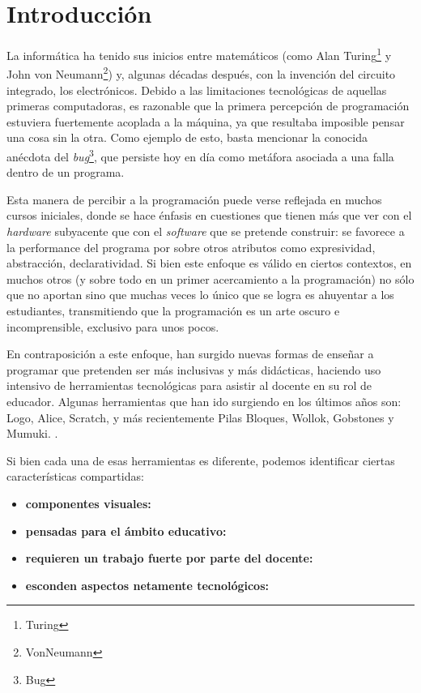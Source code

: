 
\newcommand{\caracteristica}[1]{\item \textbf{#1:}}

\section{Introducción}
La informática ha tenido sus inicios entre matemáticos (como Alan Turing\footnote{Turing} y John von Neumann\footnote{VonNeumann}) y, algunas décadas después, con la invención del circuito integrado, los electrónicos. Debido a las limitaciones tecnológicas de aquellas primeras computadoras, es razonable que la primera percepción de programación estuviera fuertemente acoplada a la máquina, ya que resultaba imposible pensar una cosa sin la otra. Como ejemplo de esto, basta mencionar la conocida anécdota del \textit{bug}\footnote{Bug}, que persiste hoy en día como metáfora asociada a una falla dentro de un programa.


Esta manera de percibir a la programación puede verse reflejada en muchos cursos iniciales, donde se hace énfasis en cuestiones que tienen más que ver con el \textit{hardware} subyacente que con el \textit{software} que se pretende construir: se favorece a la performance del programa por sobre otros atributos como expresividad, abstracción, declaratividad. Si bien este enfoque es válido en ciertos contextos, en muchos otros (y sobre todo en un primer acercamiento a la programación) no sólo que no aportan sino que muchas veces lo único que se logra es ahuyentar a los estudiantes, transmitiendo que la programación es un arte oscuro e incomprensible, exclusivo para unos pocos.

En contraposición a este enfoque, han surgido nuevas formas de enseñar a programar que pretenden ser más inclusivas y más didácticas, haciendo uso intensivo de herramientas tecnológicas para asistir al docente en su rol de educador. Algunas herramientas que han ido surgiendo en los últimos años son: Logo, Alice, Scratch, y más recientemente Pilas Bloques, Wollok, Gobstones y Mumuki. .

Si bien cada una de esas herramientas es diferente, podemos identificar ciertas características compartidas:
\begin{itemize}
  \caracteristica{componentes visuales}
  \caracteristica{pensadas para el ámbito educativo}
  \caracteristica{requieren un trabajo fuerte por parte del docente}
  \caracteristica{esconden aspectos netamente tecnológicos}
\end{itemize}

